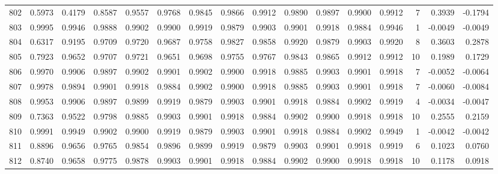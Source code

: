 \begin{tabular}{lrrrrrrrrrrrrrrr}
802 &      0.5973 &  0.4179 &  0.8587 &  0.9557 &  0.9768 &  0.9845 &  0.9866 &  0.9912 &  0.9890 &  0.9897 &   0.9900 &     0.9912 &      7 &                    0.3939 &                    -0.1794 \\
803 &      0.9995 &  0.9946 &  0.9888 &  0.9902 &  0.9900 &  0.9919 &  0.9879 &  0.9903 &  0.9901 &  0.9918 &   0.9884 &     0.9946 &      1 &                   -0.0049 &                    -0.0049 \\
804 &      0.6317 &  0.9195 &  0.9709 &  0.9720 &  0.9687 &  0.9758 &  0.9827 &  0.9858 &  0.9920 &  0.9879 &   0.9903 &     0.9920 &      8 &                    0.3603 &                     0.2878 \\
805 &      0.7923 &  0.9652 &  0.9707 &  0.9721 &  0.9651 &  0.9698 &  0.9755 &  0.9767 &  0.9843 &  0.9865 &   0.9912 &     0.9912 &     10 &                    0.1989 &                     0.1729 \\
806 &      0.9970 &  0.9906 &  0.9897 &  0.9902 &  0.9901 &  0.9902 &  0.9900 &  0.9918 &  0.9885 &  0.9903 &   0.9901 &     0.9918 &      7 &                   -0.0052 &                    -0.0064 \\
807 &      0.9978 &  0.9894 &  0.9901 &  0.9918 &  0.9884 &  0.9902 &  0.9900 &  0.9918 &  0.9885 &  0.9903 &   0.9901 &     0.9918 &      7 &                   -0.0060 &                    -0.0084 \\
808 &      0.9953 &  0.9906 &  0.9897 &  0.9899 &  0.9919 &  0.9879 &  0.9903 &  0.9901 &  0.9918 &  0.9884 &   0.9902 &     0.9919 &      4 &                   -0.0034 &                    -0.0047 \\
809 &      0.7363 &  0.9522 &  0.9798 &  0.9885 &  0.9903 &  0.9901 &  0.9918 &  0.9884 &  0.9902 &  0.9900 &   0.9918 &     0.9918 &     10 &                    0.2555 &                     0.2159 \\
810 &      0.9991 &  0.9949 &  0.9902 &  0.9900 &  0.9919 &  0.9879 &  0.9903 &  0.9901 &  0.9918 &  0.9884 &   0.9902 &     0.9949 &      1 &                   -0.0042 &                    -0.0042 \\
811 &      0.8896 &  0.9656 &  0.9765 &  0.9854 &  0.9896 &  0.9899 &  0.9919 &  0.9879 &  0.9903 &  0.9901 &   0.9918 &     0.9919 &      6 &                    0.1023 &                     0.0760 \\
812 &      0.8740 &  0.9658 &  0.9775 &  0.9878 &  0.9903 &  0.9901 &  0.9918 &  0.9884 &  0.9902 &  0.9900 &   0.9918 &     0.9918 &     10 &                    0.1178 &                     0.0918 \\

\end{tabular}
